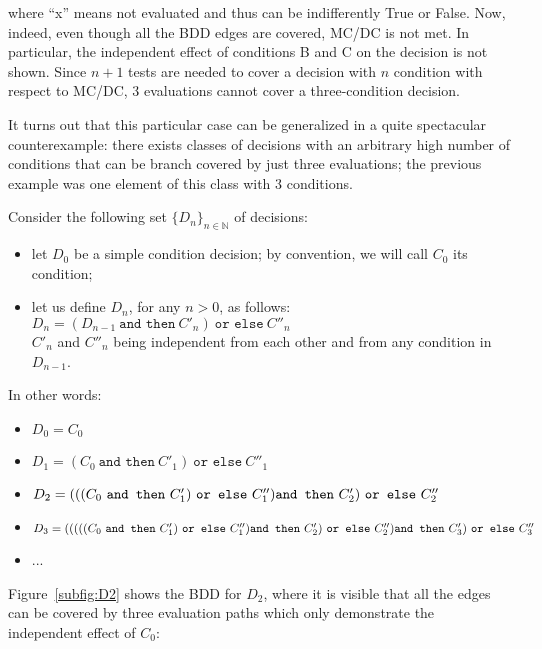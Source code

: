 \documentclass[a4paper,12pt,twoside]{article}
\newcommand{\N}{\mathbb{N}}
\newcommand{\andthen}{\texttt{and then}}
\newcommand{\orelse}{\texttt{or else}}
\begin{document}
where ``x'' means not evaluated and thus can be indifferently True or False.
%
Now, indeed, even though all the BDD edges are covered, MC/DC is not met. In
particular, the independent effect of conditions B and C on the decision is
not shown.  Since $n+1$ tests are needed to cover a decision with $n$
condition with respect to MC/DC, 3 evaluations cannot cover a three-condition
decision.

It turns out that this particular case can be generalized in a
quite spectacular counterexample: there exists classes of decisions
with an arbitrary high number of conditions that can be branch covered
by just three evaluations; the previous example was one element of this
class with 3 conditions.

Consider the following set $\{D_{n}\}_{n \in \N}$  of decisions:

\begin{itemize}
\item let $D_{0}$ be a simple condition decision; by convention,
      we will call $C_{0}$ its condition;
\item let us define $D_{n}$, for any $n>0$, as follows:\\
      $D_{n} = (D_{n-1} \ \andthen{} \ C'_{n}) \ \orelse{} \ C''_{n}$\\
      $C'_{n}$ and $C''_{n}$ being independent from each other and from
      any condition in $D_{n-1}$.
\end{itemize}

In other words:
\begin{itemize}
\item $D_{0} = C_{0}$
\item $D_{1} = (C_{0} \ \andthen{} \ C'_{1}) \ \orelse{} \ C''_{1}$
\item $D_{2} = (((C_{0} \ \andthen{} \ C'_{1}) \ \orelse{} \ C''_{1})\\
                 \andthen{} \ C'_{2}) \ \orelse{} \ C''_{2}$
\item $D_{3} = (((((C_{0} \ \andthen{} \ C'_{1}) \ \orelse{} \ C''_{1})\\
                 \andthen{} \ C'_{2}) \ \orelse{} \ C''_{2})\\
                   \andthen{} \ C'_{3}) \ \orelse{} \ C''_{3}$
\item ...
\end{itemize}

Figure~\ref{subfig:D2} shows the BDD for $D_{2}$, where it is visible
that all the edges can be covered by three evaluation paths which only
demonstrate the independent effect of $C_{0}$:
\end{document}
